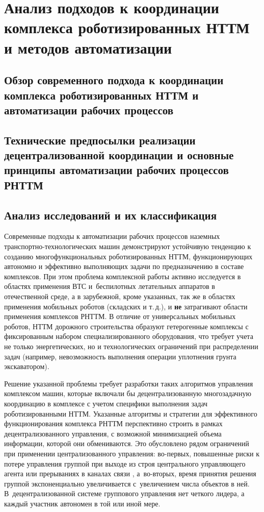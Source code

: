 \chapter{Анализ подходов к координации комплекса роботизированных НТТМ и методов автоматизации}\label{ch:ch1}

\section{Обзор современного подхода к координации комплекса роботизированных НТТМ и автоматизации рабочих процессов}\label{sec:ch1/sec1}


\section{Технические предпосылки реализации децентрализованной координации и основные принципы автоматизации рабочих процессов РНТТМ}\label{sec:ch1/sec2}


\section{Анализ исследований и их классификация}\label{sec:ch1/sec3}


\label{sec:ch1/sec4}

Современные подходы к автоматизации рабочих процессов наземных транспортно-технологических машин демонстрируют устойчивую тенденцию к созданию многофункциональных роботизированных НТТМ, функционирующих автономно и эффективно выполняющих задачи по предназначению в составе комплексов. При этом проблема комплексной работы активно исследуется в областях применения ВТС и~беспилотных летательных аппаратов в отечественной среде, а в зарубежной, кроме указанных, так же в областях применения мобильных роботов (складских и т.\,д.), и \textbf{не} затрагивают области применения комплексов РНТТМ. В отличие от универсальных мобильных роботов, НТТМ дорожного строительства образуют гетерогенные комплексы с фиксированным набором специализированного оборудования, что требует учета не только энергетических, но и технологических ограничений при распределении задач (например, невозможность выполнения операции уплотнения грунта экскаватором).

Решение указанной проблемы требует разработки таких алгоритмов управления комплексом машин, которые включали бы децентрализованную многозадачную координацию в комплексе с учетом специфики выполнения задач роботизированными НТТМ. Указанные алгоритмы и стратегии для эффективного функционирования комплекса РНТТМ перспективно строить в рамках децентрализованного управления, с возможной минимизацией объема информации, которой они обмениваются. Это обусловлено рядом ограничений при применении централизованного управления: во-первых, повышенные риски к потере управления группой при выходе из строя центрального управляющего агента или прерываниях в каналах связи \cite{habr2012kvis}, а~во-вторых, время принятия решения группой экспоненциально увеличивается с~увеличением числа объектов в ней. В~децентрализованной системе группового управления нет четкого лидера, а каждый участник автономен в той или иной мере.


